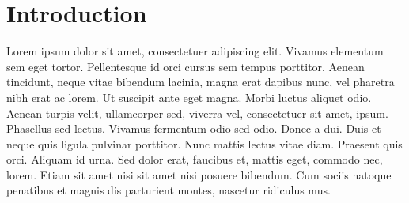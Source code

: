 \chapter{Introduction}
Lorem ipsum dolor sit amet, consectetuer adipiscing elit. Vivamus elementum sem eget tortor. Pellentesque id orci cursus sem tempus porttitor. Aenean tincidunt, neque vitae bibendum lacinia, magna erat dapibus nunc, vel pharetra nibh erat ac lorem. Ut suscipit ante eget magna. Morbi luctus aliquet odio. Aenean turpis velit, ullamcorper sed, viverra vel, consectetuer sit amet, ipsum. Phasellus sed lectus. Vivamus fermentum odio sed odio. Donec a dui. Duis et neque quis ligula pulvinar porttitor. Nunc mattis lectus vitae diam. Praesent quis orci. Aliquam id urna. Sed dolor erat, faucibus et, mattis eget, commodo nec, lorem. Etiam sit amet nisi sit amet nisi posuere bibendum. Cum sociis natoque penatibus et magnis dis parturient montes, nascetur ridiculus mus.

